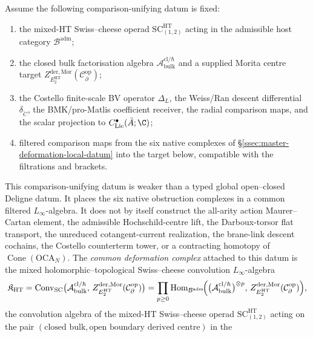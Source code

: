 \begin{defn}\label{defn:common-ht-deformation-complex}
Assume the following comparison-unifying datum is fixed:
\begin{enumerate}[label=\textup{(K\arabic*)}]
\item the mixed-HT Swiss--cheese operad
  \(\mathrm{SC}^{\mathrm{HT}}_{(1,2)}\) acting in the admissible host
  category \(\mathcal B^{\mathrm{adm}}\);
\item the closed bulk factorisation algebra
  \(\mathcal A^{\mathrm{cl}/\hbar}_{\mathrm{bulk}}\) and a supplied
  Morita centre target
  \(Z^{\mathrm{der},\mathrm{Mor}}_{E_2^{\mathrm{HT}}}
  (\mathcal C^{\mathrm{op}}_\partial)\);
\item the Costello finite-scale BV operator \(\Delta_L\), the
  Weiss/Ran descent differential \(\delta_{\check C}\), the
  BMK/pro-Matlis coefficient receiver, the radial comparison maps, and
  the scalar projection to \(C^\bullet_{\mathrm{Lie}}(\bar A;\C)\);
\item filtered comparison maps from the six native complexes of
  \S\ref{ssec:master-deformation-local-datum} into the target below,
  compatible with the filtrations and brackets.
\end{enumerate}
This comparison-unifying datum is weaker than a typed global
open--closed Deligne datum.  It places the six native obstruction
complexes in a common filtered \(L_\infty\)-algebra.  It does not by
itself construct the all-arity action Maurer--Cartan element, the
admissible Hochschild-centre lift, the Darboux-torsor flat transport,
the unreduced cotangent-current realization, the brane-link descent
cochains, the Costello counterterm tower, or a contracting homotopy of
\(\operatorname{Cone}(\mathrm{OCA}_N)\).
The \emph{common deformation complex} attached to this datum is the
mixed holomorphic--topological Swiss--cheese convolution
\(L_\infty\)-algebra
\[
  \mathfrak K_{\mathrm{HT}}
  =\operatorname{Conv}_{\mathrm{SC}}\bigl(
   \mathcal A^{\mathrm{cl}/\hbar}_{\mathrm{bulk}},\,
   Z^{\mathrm{der},\mathrm{Mor}}_{E_2^{\mathrm{HT}}}
     (\mathcal C^{\mathrm{op}}_\partial)\bigr)
  =\prod_{p\ge0}\operatorname{Hom}_{\mathcal B^{\mathrm{adm}}}\!\Bigl(
   \bigl(\mathcal A^{\mathrm{cl}/\hbar}_{\mathrm{bulk}}\bigr)^{\otimes p},\,
   Z^{\mathrm{der},\mathrm{Mor}}_{E_2^{\mathrm{HT}}}
     (\mathcal C^{\mathrm{op}}_\partial)\Bigr),
\]
the convolution algebra of the mixed-HT Swiss--cheese operad
\(\mathrm{SC}^{\mathrm{HT}}_{(1,2)}\) acting on the pair
\((\text{closed bulk},\text{open boundary derived centre})\) in the

\end{defn}
